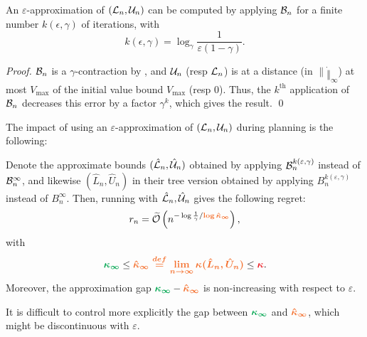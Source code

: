 \documentclass[runningheads]{llncs}
\begin{document}
\begin{proposition}
An $\varepsilon$-approximation of $(\mathcal{L}_n, \mathcal{U}_n)$ can be computed by applying $\mathcal{B}_n$ for a finite number $k(\epsilon,\gamma)$ of iterations, with $$k(\epsilon,\gamma) = \log_\gamma\frac{1}{\varepsilon(1-\gamma)}.$$ 
\end{proposition}
\begin{proof}
	$\mathcal{B}_n$ is a $\gamma$-contraction by , and $\mathcal{U}_n$ (resp $\mathcal{L}_n$) is at a distance (in $\|\dot\|_\infty$) at most $V_{\max}$ of the initial value bound $V_{\max}$ (resp $0$). Thus, the $k^{\text{th}}$ application of $\mathcal{B}_n$ decreases this error by a factor $\gamma^k$, which gives the result.
\qed\end{proof}

The impact of using an $\varepsilon$-approximation of $(\mathcal{L}_n, \mathcal{U}_n)$ during planning is the following:
\begin{proposition}
	\label{prop:early-stopping}
Denote the approximate bounds $(\hat{\mathcal{L}}_n, \hat{\mathcal{U}}_n)$ obtained by applying $\mathcal{B}_n^{k(\varepsilon,\gamma)}$ instead of $\mathcal{B}_n^\infty$, and likewise $(\hat{L}_n, \hat{U}_n)$ in their tree version obtained by applying $B_n^{k(\varepsilon,\gamma)}$ instead of $B_n^\infty$.
Then, running \GBOPD with $\hat{\mathcal{L}}_n, \hat{\mathcal{U}}_n$ gives the following regret:
\begin{align*}
r_n = \tilde{\cO}\left(n^{-\log \frac{1}{\gamma}/\hlob{\log \hat{\kappa}_\infty}}\right),
\end{align*}
with $$\hlgb{{\kappa}_\infty} \leq \hlob{\hat{\kappa}_\infty \eqdef \lim_{n\rightarrow\infty} \kappa(\hat{L}_n, \hat{U}_n)} \leq \hlrb{\kappa}.$$
Moreover, the approximation gap $\hlgb{\kappa_\infty} - \hlob{\hat{\kappa}_\infty}$ is non-increasing with respect to $\varepsilon$.
\end{proposition}
It is difficult to control more explicitly the gap between $\hlgb{\kappa_\infty}$ and $\hlob{\hat{\kappa}_\infty}$, which might be discontinuous with $\varepsilon$.
\end{document}
